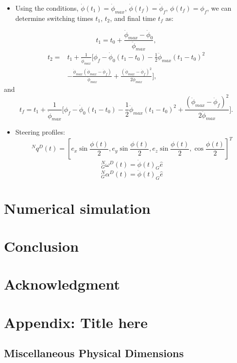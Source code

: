 \documentclass[letterpaper, preprint, paper,11pt]{AAS}	%
\begin{document}
	\begin{itemize}
		\item Using the conditions, $\dot{\phi}(t_1)=\dot{\phi}_{max}$, $\dot{\phi}(t_f)=\dot{\phi}_f$, $\phi(t_f)=\phi_f$, we can determine switching times $t_1$, $t_2$, and final time $t_f$ as:
	\end{itemize}
	\begin{equation}\label{t1cons}
	t_1=t_0+\frac{\dot{\phi}_{max}-\dot{\phi}_0}{\ddot{\phi}_{max}},
	\end{equation}
	\begin{equation}\label{t2cons}
	\begin{split}
	t_2=&t_1+\frac{1}{\dot{\phi}_{max}}\Big[ \phi_f-\dot{\phi}_0(t_1-t_0)-\frac{1}{2}\ddot{\phi}_{max}(t_1-t_0)^2\\
	&-\frac{\dot{\phi}_{max}(\dot{\phi}_{max}-\dot{\phi}_f)}{\ddot{\phi}_{max}}+\frac{(\dot{\phi}_{max}-\dot{\phi}_f)^2}{2\ddot{\phi}_{max}} \Big],
	\end{split}
	\end{equation}
	and
	\begin{equation}\label{tfcons}
	t_f=t_1+\frac{1}{\dot{\phi}_{max}}\Big[ \phi_f-\dot{\phi}_0(t_1-t_0)-\frac{1}{2}\ddot{\phi}_{max}(t_1-t_0)^2+\frac{(\dot{\phi}_{max}-\dot{\phi}_f)^2}{2\ddot{\phi}_{max}} \Big].
	\end{equation}
	
	\begin{itemize}
		\item Steering profiles:
		\begin{equation}
		^Nq^D(t)=[e_x\sin\frac{\phi(t)}{2}, e_y\sin\frac{\phi(t)}{2}, e_z\sin\frac{\phi(t)}{2}, \cos\frac{\phi(t)}{2}]^T
		\end{equation}
		\begin{equation}
		^N_G\omega^D(t)=\dot{\phi}(t)_G\hat{e}
		\end{equation}
		\begin{equation}
		^N_G\alpha^D(t)=\ddot{\phi}(t)_G\hat{e}
		\end{equation}
	\end{itemize}
	
	\section{Numerical simulation} 
	
	\section{Conclusion}
	
	\section{Acknowledgment}
	
	\appendix
	\section*{Appendix: Title here}
	
	\subsection*{Miscellaneous Physical Dimensions}
	
	
	
	
\end{document}
